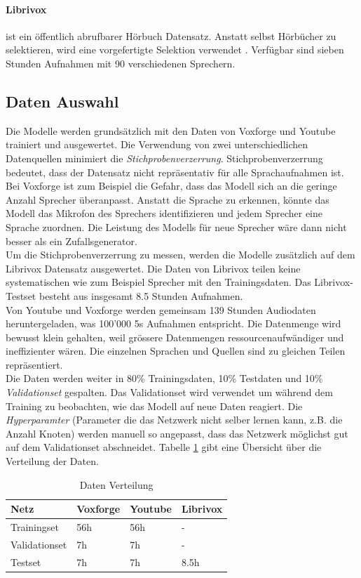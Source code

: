 \paragraph{Librivox} ist ein öffentlich abrufbarer Hörbuch Datensatz. Anstatt selbst Hörbücher zu selektieren, wird eine vorgefertigte Selektion verwendet \cite{librivox-compilation}. Verfügbar sind sieben Stunden Aufnahmen mit 90 verschiedenen Sprechern.


\subsection{Daten Auswahl}
Die Modelle werden grundsätzlich mit den Daten von Voxforge und Youtube trainiert und ausgewertet. Die Verwendung von zwei unterschiedlichen Datenquellen minimiert die \textit{Stichprobenverzerrung}. Stichprobenverzerrung bedeutet, dass der Datensatz nicht repräsentativ für alle Sprachaufnahmen ist. Bei Voxforge ist zum Beispiel die Gefahr, dass das Modell sich an die geringe Anzahl Sprecher überanpasst. Anstatt die Sprache zu erkennen, könnte das Modell das Mikrofon des Sprechers identifizieren und jedem Sprecher eine Sprache zuordnen. Die Leistung des Modells für neue Sprecher wäre dann nicht besser als ein Zufallsgenerator.
\\
Um die Stichprobenverzerrung zu messen, werden die Modelle zusätzlich auf dem Librivox Datensatz ausgewertet. Die Daten von Librivox teilen keine systematischen  wie zum Beispiel Sprecher mit den Trainingsdaten. Das Librivox-Testset besteht aus insgesamt 8.5 Stunden Aufnahmen.
\\
Von Youtube und Voxforge werden gemeinsam 139 Stunden Audiodaten heruntergeladen, was 100'000 5s Aufnahmen entspricht. Die Datenmenge wird bewusst klein gehalten, weil grössere Datenmengen ressourcenaufwändiger und ineffizienter wären. Die einzelnen Sprachen und Quellen sind zu gleichen Teilen repräsentiert. 
\\
Die Daten werden weiter in 80\% Trainingsdaten, 10\% Testdaten und 10\% \textit{Validationset} gespalten. Das Validationset wird verwendet um während dem Training zu beobachten, wie das Modell auf neue Daten reagiert. Die \textit{Hyperparamter} (Parameter die das Netzwerk nicht selber lernen kann, z.B. die Anzahl Knoten) werden manuell so angepasst, dass das Netzwerk möglichst gut auf dem Validationset abschneidet. Tabelle \ref{tab:data} gibt eine Übersicht über die Verteilung der Daten.
\begin{table}[]
	\centering
	\begin{tabular}{llll}
	\hline
	Netz          & Voxforge & Youtube & Librivox \\ \hline
	Trainingset   & 56h      & 56h     & -        \\
	Validationset & 7h       & 7h      & -        \\
	Testset       & 7h       & 7h      & 8.5h       \\ \hline
	\end{tabular}
	\caption{Daten Verteilung}
	\label{tab:data}
\end{table}



